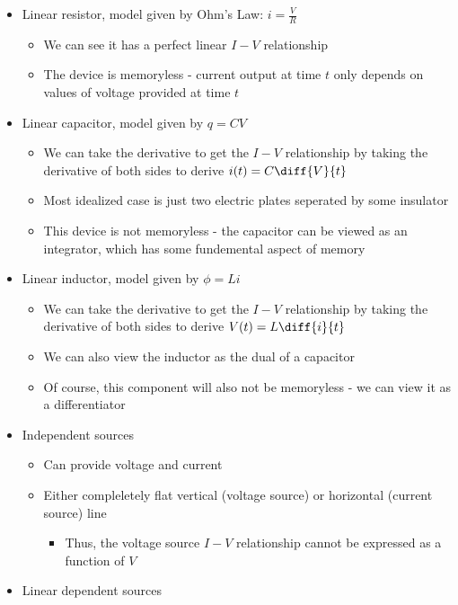 \documentclass{report}
\begin{document}
\begin{itemize}
    \item Linear resistor, model given by Ohm's Law: $i = \frac{V}{R}$
    \begin{itemize}
        \item We can see it has a perfect linear $I-V$ relationship
        \item The device is memoryless - current output at time $t$ only depends on values of voltage provided at time $t$
    \end{itemize}
    \item Linear capacitor, model given by $q = CV$
    \begin{itemize}
        \item We can take the derivative to get the $I-V$ relationship by taking the derivative of both sides to derive $i(t) = C \diff{V}{t}$
        \item Most idealized case is just two electric plates seperated by some insulator
        \item This device is not memoryless - the capacitor can be viewed as an integrator, which has some fundemental aspect of memory
    \end{itemize}
    \item Linear inductor, model given by $\phi = Li$
    \begin{itemize}
        \item We can take the derivative to get the $I-V$ relationship by taking the derivative of both sides to derive $V(t) = L \diff{i}{t}$
        \item We can also view the inductor as the dual of a capacitor
        \item Of course, this component will also not be memoryless - we can view it as a differentiator
    \end{itemize}
    \item Independent sources
    \begin{itemize}
        \item Can provide voltage and current
        \item Either compleletely flat vertical (voltage source) or horizontal (current source) line
        \begin{itemize}
            \item Thus, the voltage source $I-V$ relationship cannot be expressed as a function of $V$
        \end{itemize}
    \end{itemize}
    \item Linear dependent sources

\end{itemize}
\end{document}
